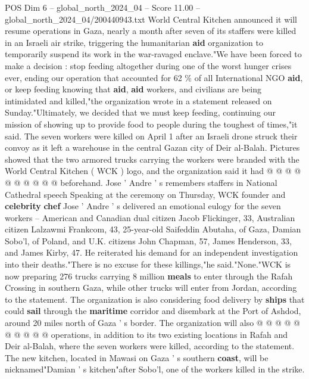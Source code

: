 \begin{textsample}{POS Dim 6 – global\_north\_2024\_04 – Score 11.00 – global\_north\_2024\_04/200440943.txt}  \label{ex:f6_pos_073}
World Central Kitchen announced it will resume operations in Gaza, nearly a month after seven of its staffers were killed in an Israeli air strike, triggering the humanitarian \textbf{aid} organization to temporarily suspend its work in the war-ravaged enclave."We have been forced to make a decision : stop feeding altogether during one of the worst hunger crises ever, ending our operation that accounted for 62 \% of all International NGO \textbf{aid}, or keep feeding knowing that \textbf{aid}, \textbf{aid} workers, and civilians are being intimidated and killed,"the organization wrote in a statement released on Sunday."Ultimately, we decided that we must keep feeding, continuing our mission of showing up to provide food to people during the toughest of times,"it said.
The seven workers were killed on April 1 after an Israeli drone struck their convoy as it left a warehouse in the central Gazan city of Deir al-Balah.
Pictures showed that the two armored trucks carrying the workers were branded with the World Central Kitchen ( WCK ) logo, and the organization said it had @ @ @ @ @ @ @ @ @ @ beforehand.
Jose ' Andre ' s remembers staffers in National Cathedral speech Speaking at the ceremony on Thursday, WCK founder and \textbf{celebrity} \textbf{chef} Jose ' Andre ' s delivered an emotional eulogy for the seven workers -- American and Canadian dual citizen Jacob Flickinger, 33, Australian citizen Lalzawmi Frankcom, 43, 25-year-old Saifeddin Abutaha, of Gaza, Damian Sobo'l, of Poland, and U.K. citizens John Chapman, 57, James Henderson, 33, and James Kirby, 47.
He reiterated his demand for an independent investigation into their deaths."There is no excuse for these killings,"he said."None."WCK is now preparing 276 trucks carrying 8 million \textbf{meals} to enter through the Rafah Crossing in southern Gaza, while other trucks will enter from Jordan, according to the statement.
The organization is also considering food delivery by \textbf{ships} that could \textbf{sail} through the \textbf{maritime} corridor and disembark at the Port of Ashdod, around 20 miles north of Gaza ' s border.
The organization will also @ @ @ @ @ @ @ @ @ @ operations, in addition to its two existing locations in Rafah and Deir al-Balah, where the seven workers were killed, according to the statement.
The new kitchen, located in Mawasi on Gaza ' s southern \textbf{coast}, will be nicknamed"Damian ' s kitchen"after Sobo'l, one of the workers killed in the strike.

\end{textsample}
